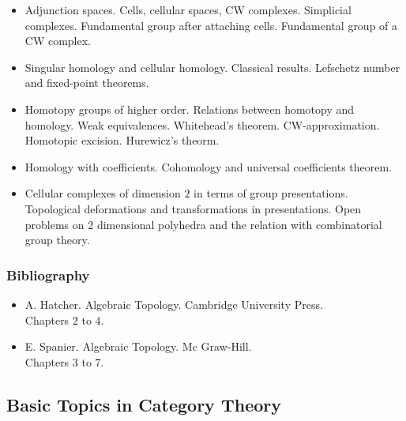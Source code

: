 \documentclass[spanish]{article}
\begin{document}
\begin{itemize}
  \item
Adjunction spaces. Cells, cellular spaces, CW complexes. Simplicial complexes.
Fundamental group after attaching cells. Fundamental group of a CW complex.

  \item
Singular homology and cellular homology. Classical results. Lefschetz number and
fixed-point theorems.

  \item
Homotopy groups of higher order. Relations between homotopy and homology. Weak
equivalences. Whitehead's theorem. CW-approximation. Homotopic excision.
Hurewicz's theorm.

  \item
Homology with coefficients. Cohomology and universal coefficients theorem.

  \item
Cellular complexes of dimension $2$ in terms of group presentations.
Topological deformations and transformations in presentations. Open problems
on $2$ dimensional polyhedra and the relation with combinatorial group theory.

\end{itemize}


\subsubsection{Bibliography}
\begin{itemize}
  \item
A. Hatcher. Algebraic Topology. Cambridge University Press.\\
Chapters $2$ to $4$.

  \item
E. Spanier. Algebraic Topology. Mc Graw-Hill.\\
Chapters $3$ to $7$.

\end{itemize}


\hrulefill%

\subsection{Basic Topics in Category Theory}
\end{document}
